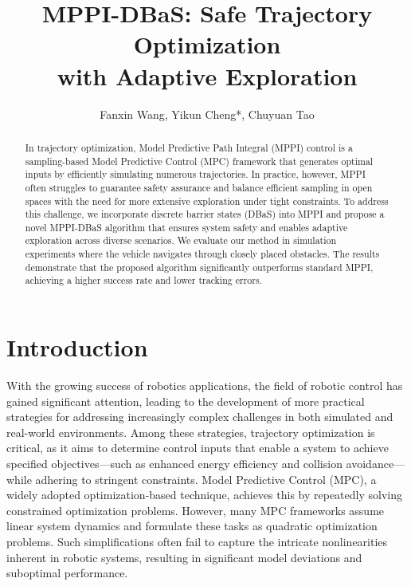 \documentclass[english]{cccconf}
\begin{document}
\title{MPPI-DBaS: Safe Trajectory Optimization  \\ with Adaptive Exploration}

\author{Fanxin Wang,
        Yikun Cheng*,
        Chuyuan Tao}



\maketitle

\begin{abstract}
In trajectory optimization, Model Predictive Path Integral (MPPI) control is a sampling-based Model Predictive Control (MPC) framework that generates optimal inputs by efficiently simulating numerous trajectories. In practice, however, MPPI often struggles to guarantee safety assurance and balance efficient sampling in open spaces with the need for more extensive exploration under tight constraints. To address this challenge, we incorporate discrete barrier states (DBaS) into MPPI and propose a novel MPPI-DBaS algorithm that ensures system safety and enables adaptive exploration across diverse scenarios. We evaluate our method in simulation experiments where the vehicle navigates through closely placed obstacles. The results demonstrate that the proposed algorithm significantly outperforms standard MPPI, achieving a higher success rate and lower tracking errors.
\end{abstract}




\section{Introduction}



With the growing success of robotics applications, the field of robotic control has gained significant attention, leading to the development of more practical strategies for addressing increasingly complex challenges in both simulated and real-world environments. Among these strategies, trajectory optimization is critical, as it aims to determine control inputs that enable a system to achieve specified objectives—such as enhanced energy efficiency and collision avoidance—while adhering to stringent constraints. Model Predictive Control (MPC), a widely adopted optimization-based technique, achieves this by repeatedly solving constrained optimization problems. However, many MPC frameworks assume linear system dynamics and formulate these tasks as quadratic optimization problems. Such simplifications often fail to capture the intricate nonlinearities inherent in robotic systems, resulting in significant model deviations and suboptimal performance.
\end{document}
